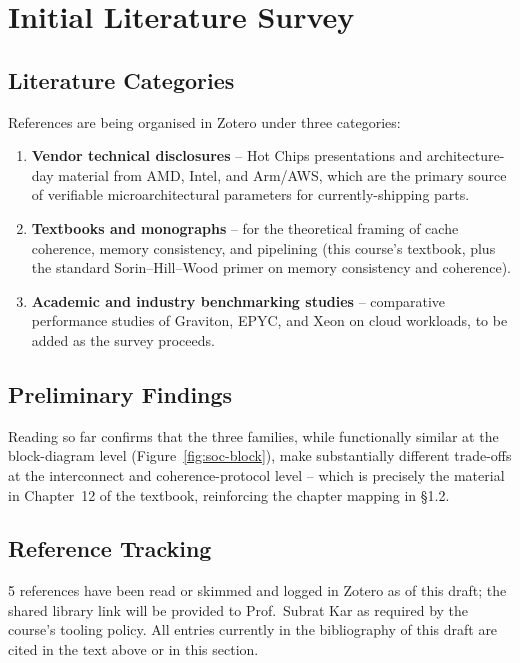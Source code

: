 \documentclass[11pt,a4paper]{article}
\begin{document}
\section{Initial Literature Survey}
\label{sec:litsurvey}

\subsection{Literature Categories}
References are being organised in Zotero under three categories:
\begin{enumerate}[nosep]
  \item \textbf{Vendor technical disclosures} -- Hot Chips presentations and architecture-day
        material from AMD, Intel, and Arm/AWS, which are the primary source of verifiable
        microarchitectural parameters for currently-shipping parts.
  \item \textbf{Textbooks and monographs} -- for the theoretical framing of cache coherence,
        memory consistency, and pipelining (this course's textbook, plus the standard
        Sorin--Hill--Wood primer on memory consistency and coherence).
  \item \textbf{Academic and industry benchmarking studies} -- comparative performance
        studies of Graviton, EPYC, and Xeon on cloud workloads, to be added as the survey
        proceeds.
\end{enumerate}

\subsection{Preliminary Findings}
Reading so far confirms that the three families, while functionally similar at the block-diagram
level (Figure~\ref{fig:soc-block}), make substantially different trade-offs at the
interconnect and coherence-protocol level -- which is precisely the material in Chapter~12 of
the textbook, reinforcing the chapter mapping in \S1.2.

\subsection{Reference Tracking}
5 references have been read or skimmed and logged in Zotero as of this draft; the shared
library link will be provided to Prof.\ Subrat Kar as required by the course's tooling policy.
All entries currently in the bibliography of this draft are cited in the text above or in this
section.
\end{document}
